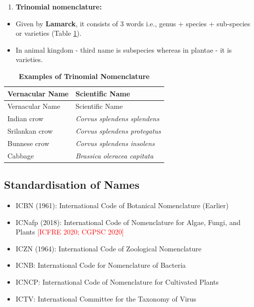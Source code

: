 \documentclass[
]{book}
\providecommand{\tightlist}{%
  \setlength{\itemsep}{0pt}\setlength{\parskip}{0pt}}
\begin{document}
\begin{enumerate}
\def\labelenumi{\arabic{enumi}.}
\setcounter{enumi}{2}
\tightlist
\item
  \textbf{Trinomial nomenclature:}
\end{enumerate}

\begin{itemize}
\tightlist
\item
  Given by \textbf{Lamarck}, it consists of 3 words i.e., genus + species + sub-species or varieties (Table \ref{tab:t71}).
\item
  In animal kingdom - third name is subspecies whereas in plantae - it is varieties.
\end{itemize}

\begin{longtable}[]{@{}ll@{}}
\caption{\textbf{\label{tab:t71} Examples of Trinomial Nomenclature}}\tabularnewline
\toprule
Vernacular Name & Scientific Name \\
\midrule
\endfirsthead
\toprule
Vernacular Name & Scientific Name \\
\midrule
\endhead
Indian crow & \emph{Corvus splendens splendens} \\
Srilankan crow & \emph{Corvus splendens protegatus} \\
Bunnese crow & \emph{Corvus splendens insolens} \\
Cabbage & \emph{Brassica oleracea capitata} \\
\bottomrule
\end{longtable}

\hypertarget{standardisation-of-names}{%
\subsection{Standardisation of Names}\label{standardisation-of-names}}

\begin{itemize}
\tightlist
\item
  ICBN (1961): International Code of Botanical Nomenclature (Earlier)
\item
  ICNafp (2018): International Code of Nomenclature for Algae, Fungi, and Plants \textcolor{red}{[ICFRE 2020; CGPSC 2020]}
\item
  ICZN (1964): International Code of Zoological Nomenclature
\item
  ICNB: International Code for Nomenclature of Bacteria
\item
  ICNCP: International Code of Nomenclature for Cultivated Plants
\item
  ICTV: International Committee for the Taxonomy of Virus
\end{itemize}
\end{document}
